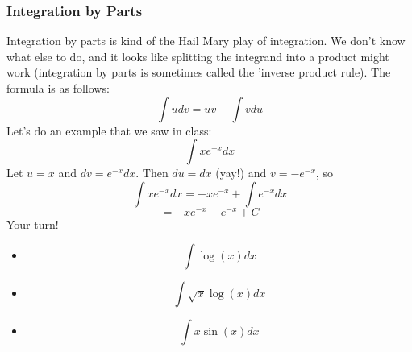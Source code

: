 \documentclass[12pt,a4paper]{article} %
\begin{document}
\subsubsection{Integration by Parts}
Integration by parts is kind of the Hail Mary play of integration. We don't know what else to do, and it looks like splitting the integrand into a product might work (integration by parts is sometimes called the 'inverse product rule). The formula is as follows:
$$\int u dv = uv - \int v du$$
Let's do an example that we saw in class:
$$\int x e^{-x} dx$$
Let $u = x$ and $dv = e^{-x} dx$. Then $du = dx$ (yay!) and $v=-e^{-x}$, so
$$\int x e^{-x} dx = -xe^{-x} + \int e^{-x} dx$$
$$= -xe^{-x} - e^{-x} + C$$
Your turn!
\begin{itemize}
\item $$\int\log(x) dx$$
\item $$\int \sqrt{x} \log(x) dx$$
\item $$\int x \sin(x) dx$$
\end{itemize}
\end{document}
